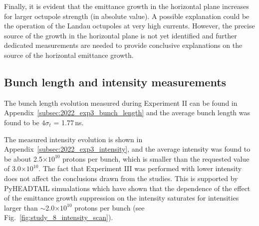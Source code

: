 Finally, it is evident that the emittance growth in the horizontal plane increases for larger octupole strength (in absolute value). A possible explanation could be the operation of the Landau octupoles at very high currents. However, the precise source of the growth in the horizontal plane is not yet identified and further dedicated measurements are needed to provide conclusive explanations on the source of the horizontal emittance growth. 







\subsection{Bunch length and intensity measurements}\label{subsec:bunch_length_intensity_exp3}

The bunch length evolution measured during Experiment II can be found in Appendix~\ref{subsec:2022_exp3_bunch_length} and the average bunch length was found to be $4\sigma_t$ = 1.77\,ns.

The measured intensity evolution is shown in Appendix~\ref{subsec:2022_exp3_intensity}, and the average intensity was found to be about 2.5$\times 10^{10}$ protons per bunch, which is smaller than the requested value of 3.0$\times 10^{10}$. The fact that Experiment III was performed with lower intensity does not affect the conclusions drawn from the studies. This is supported by PyHEADTAIL simualations which have shown that the dependence of the effect of the emittance growth suppression on the intensity saturates for intensities larger than $\sim$2.0$\times 10^{10}$ protons per bunch (see Fig.~\ref{fig:study_8_intensity_scan}). %


